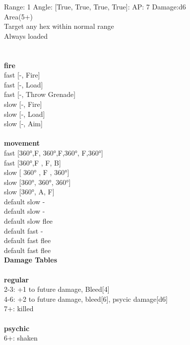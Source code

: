 Range: 1  Angle: [True, True, True, True]: AP: 7 Damage:d6 \\
Area(5+)\\ 
Target any hex within normal range\\ 
Always loaded\\ 




 
\ \\



\ \\ {\bf fire } \\
fast [-, Fire] \\
fast [-, Load] \\
fast [-, Throw Grenade] \\
slow [-, Fire] \\
slow [-, Load] \\
slow [-, Aim] \\
\ \\ {\bf movement } \\
fast [360°,F, 360°,F,360°, F,360°] \\
fast [360°,F , F, B] \\
slow [ 360° ,  F ,  360°] \\
slow [360°, 360°, 360°] \\
slow [360°, A, F] \\
default slow - \\
default slow - \\
default slow flee \\
default fast - \\
default fast flee \\
default fast flee \\


{\bf Damage Tables} \\
\ \\ {\bf regular } \\
2-3: +1 to future damage, Bleed[4] \\
4-6: +2 to future damage, bleed[6], psycic damage[d6] \\
7+: killed \\
\ \\ {\bf psychic } \\
6+: shaken \\










